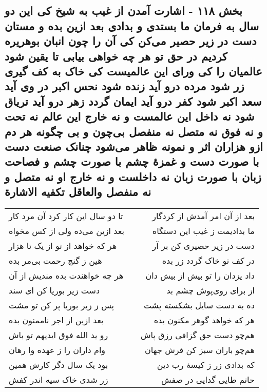 \begin{center}
\section*{بخش ۱۱۸ - اشارت آمدن از غیب به شیخ کی این دو سال به فرمان ما بستدی و بدادی بعد ازین بده و مستان دست در زیر حصیر می‌کن کی آن را چون  انبان بوهریره کردیم در حق تو هر چه خواهی بیابی تا یقین شود عالمیان  را کی ورای این عالمیست کی خاک به کف گیری زر شود مرده درو آید  زنده شود نحس اکبر در وی آید سعد اکبر شود کفر درو آید ایمان گردد  زهر درو آید تریاق شود نه داخل این  عالمست و نه خارج این عالم نه  تحت و نه فوق نه متصل نه منفصل بی‌چون و بی چگونه هر دم ازو  هزاران اثر و نمونه ظاهر می‌شود چنانک صنعت دست با صورت دست و  غمزهٔ چشم با صورت چشم و فصاحت زبان با صورت زبان نه داخلست  و نه خارج او نه متصل و نه منفصل والعاقل تکفیه الاشارة}
\label{sec:sh118}
\begin{longtable}{l p{0.5cm} r}
تا دو سال این کار کرد آن مرد کار
&&
بعد از آن امر آمدش از کردگار
\\
بعد ازین می‌ده ولی از کس مخواه
&&
ما بدادیمت ز غیب این دستگاه
\\
هر که خواهد از تو از یک تا هزار
&&
دست در زیر حصیری کن بر آر
\\
هین ز گنج رحمت بی‌مر بده
&&
در کف تو خاک گردد زر بده
\\
هر چه خواهندت بده مندیش از آن
&&
داد یزدان را تو بیش از بیش دان
\\
دست زیر بوریا کن ای سند
&&
از برای روی‌پوش چشم بد
\\
پس ز زیر بوریا پر کن تو مشت
&&
ده به دست سایل بشکسته پشت
\\
بعد ازین از اجر ناممنون بده
&&
هر که خواهد گوهر مکنون بده
\\
رو ید الله فوق ایدیهم تو باش
&&
هم‌چو دست حق گزافی رزق پاش
\\
وام داران را ز عهده وا رهان
&&
هم‌چو باران سبز کن فرش جهان
\\
بود یک سال دگر کارش همین
&&
که بدادی زر ز کیسهٔ رب دین
\\
زر شدی خاک سیه اندر کفش
&&
حاتم طایی گدایی در صفش
\\
\end{longtable}
\end{center}
